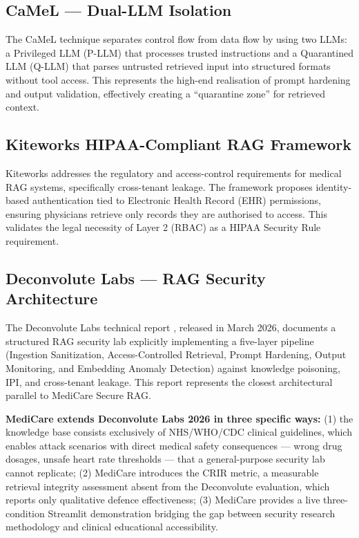 \subsection{CaMeL --- Dual-LLM Isolation}
The CaMeL technique \cite{camel2025} separates control flow from data flow by using two LLMs: a Privileged LLM (P-LLM) that processes trusted instructions and a Quarantined LLM (Q-LLM) that parses untrusted retrieved input into structured formats without tool access. This represents the high-end realisation of prompt hardening and output validation, effectively creating a ``quarantine zone'' for retrieved context.

\subsection{Kiteworks HIPAA-Compliant RAG Framework}
Kiteworks \cite{kiteworks2025} addresses the regulatory and access-control requirements for medical RAG systems, specifically cross-tenant leakage. The framework proposes identity-based authentication tied to Electronic Health Record (EHR) permissions, ensuring physicians retrieve only records they are authorised to access. This validates the legal necessity of Layer 2 (RBAC) as a HIPAA Security Rule requirement.

\subsection{Deconvolute Labs --- RAG Security Architecture}
The Deconvolute Labs technical report \cite{deconvolute2026}, released in March 2026, documents a structured RAG security lab explicitly implementing a five-layer pipeline (Ingestion Sanitization, Access-Controlled Retrieval, Prompt Hardening, Output Monitoring, and Embedding Anomaly Detection) against knowledge poisoning, IPI, and cross-tenant leakage. This report represents the closest architectural parallel to MediCare Secure RAG.

\textbf{MediCare extends Deconvolute Labs 2026 in three specific ways:} (1) the knowledge base consists exclusively of NHS/WHO/CDC clinical guidelines, which enables attack scenarios with direct medical safety consequences --- wrong drug dosages, unsafe heart rate thresholds --- that a general-purpose security lab cannot replicate; (2) MediCare introduces the CRIR metric, a measurable retrieval integrity assessment absent from the Deconvolute evaluation, which reports only qualitative defence effectiveness; (3) MediCare provides a live three-condition Streamlit demonstration bridging the gap between security research methodology and clinical educational accessibility.

